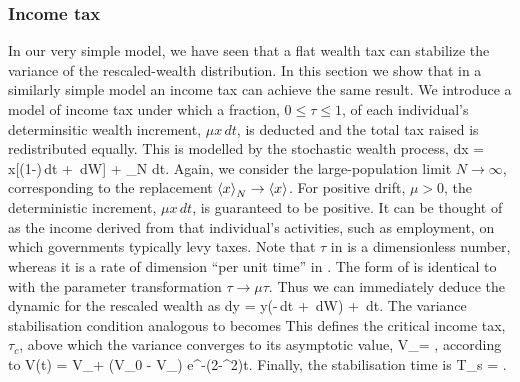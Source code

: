 \subsubsection{Income tax}
In our very simple model, we have seen that a flat wealth tax can stabilize
the variance of the rescaled-wealth distribution. In this section we show 
that in a similarly simple model an income tax can achieve the same result. 
We introduce a model of income tax under which a fraction, $0\leq\tau\leq1$, of 
each individual's determinsitic wealth increment, $\mu x\,dt$, is deducted and 
the total tax raised is redistributed equally. This is modelled by the stochastic wealth process,
\be
dx = x[\mu(1-\tau)\,dt + \sigma\,dW] + \mu\tau{}_N dt.
\ee
Again, we consider the large-population limit $N\to\infty$, corresponding to the replacement 
$\left\langle x \right\rangle_N\to\left\langle x \right\rangle$. For positive drift, $\mu>0$, the deterministic increment, $\mu x\,dt$, is guaranteed to 
be positive. It can be thought of as the income derived from that individual's activities, 
such as employment, on which governments typically levy taxes. Note that $\tau$ in  is a dimensionless number, whereas it is
a rate of dimension ``per unit time'' in . The form of 
 is identical to  with the parameter transformation 
$\tau\rightarrow\mu\tau$. Thus we can immediately deduce the dynamic for the rescaled wealth as
\be
dy = y(-\mu\tau\,dt + \sigma\,dW) + \mu\tau\,dt.
\ee
The variance stabilisation condition analogous to  becomes
\be
{}
\ee
This defines the critical income tax, $\tau_c$, above which the variance converges to its asymptotic value,
\be
V_\infty = ,
\ee
according to
\be
V(t) = V_\infty + (V_0 - V_\infty) e^{-(2\mu\tau-\sigma^2)t}.
\ee
Finally, the stabilisation time is
\be
T_s = .
\ee

